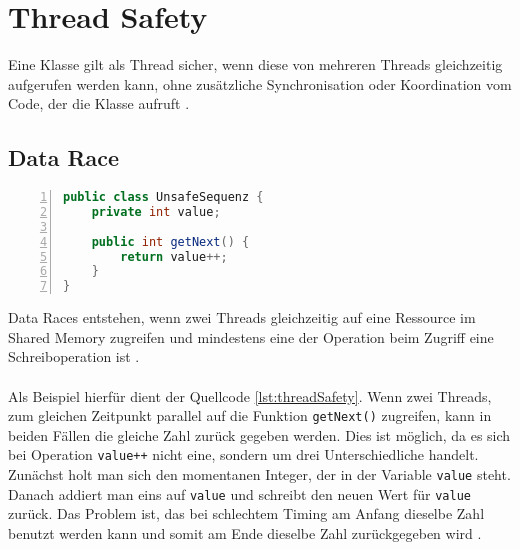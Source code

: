 \section{Thread Safety}\label{sec:threadSafety}

Eine Klasse gilt als Thread sicher, wenn diese von mehreren Threads gleichzeitig aufgerufen werden kann, ohne zusätzliche Synchronisation oder Koordination vom Code, der die Klasse aufruft \cite[vgl.][12]{brian}.



\subsection*{Data Race}
\begin{lstlisting}[language=Java,frame=tb,caption={Non-thread-safe Sequence Generator \cite{brian}}, label={lst:threadSafety}, numbers=left, stepnumber=1, captionpos=b, tabsize=4]
public class UnsafeSequenz {
	private int value;
	
	public int getNext() {
		return value++;
	}
}
\end{lstlisting}

Data Races entstehen, wenn zwei Threads gleichzeitig auf eine Ressource im Shared Memory zugreifen und mindestens eine der Operation beim Zugriff eine Schreiboperation ist \cite[vgl.][72]{banerjee_theory_2006}.\\ 
\\
Als Beispiel hierfür dient der Quellcode \ref{lst:threadSafety}. Wenn zwei Threads, zum gleichen Zeitpunkt parallel auf die Funktion \texttt{getNext()} zugreifen, kann in beiden Fällen die gleiche Zahl zurück gegeben werden. Dies ist möglich, da es sich bei Operation \texttt{value++} nicht eine, sondern um drei Unterschiedliche handelt. Zunächst holt man sich den momentanen Integer, der in der Variable \texttt{value} steht. Danach addiert man eins auf \texttt{value} und schreibt den neuen Wert für \texttt{value} zurück. Das Problem ist, das bei schlechtem Timing am Anfang dieselbe Zahl benutzt werden kann und somit am Ende dieselbe Zahl zurückgegeben wird \cite[vgl.][5]{brian}.

